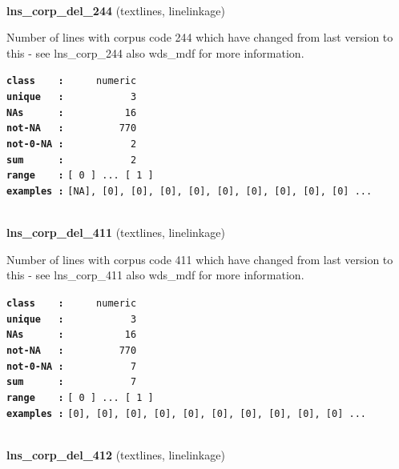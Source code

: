 \documentclass[]{article}
\begin{document}
~

\textbf{lns\_corp\_del\_244} (textlines, linelinkage)

Number of lines with corpus code 244 which have changed from last
version to this - see lns\_corp\_244 also wds\_mdf for more information.

\textbf{\texttt{class\ \ \ \ :}} \texttt{~~~~~numeric}\\
\textbf{\texttt{unique\ \ \ :}} \texttt{~~~~~~~~~~~3}\\
\textbf{\texttt{NAs\ \ \ \ \ \ :}} \texttt{~~~~~~~~~~16}\\
\textbf{\texttt{not-NA\ \ \ :}} \texttt{~~~~~~~~~770}\\
\textbf{\texttt{not-0-NA\ :}} \texttt{~~~~~~~~~~~2}\\
\textbf{\texttt{sum\ \ \ \ \ \ :}} \texttt{~~~~~~~~~~~2}\\
\textbf{\texttt{range\ \ \ \ :}}
\texttt{{[}\ 0\ {]}\ ...\ {[}\ 1\ {]}}\\
\textbf{\texttt{examples\ :}}
\texttt{{[}NA{]},\ {[}0{]},\ {[}0{]},\ {[}0{]},\ {[}0{]},\ {[}0{]},\ {[}0{]},\ {[}0{]},\ {[}0{]},\ {[}0{]}\ ...}\\

~

\textbf{lns\_corp\_del\_411} (textlines, linelinkage)

Number of lines with corpus code 411 which have changed from last
version to this - see lns\_corp\_411 also wds\_mdf for more information.

\textbf{\texttt{class\ \ \ \ :}} \texttt{~~~~~numeric}\\
\textbf{\texttt{unique\ \ \ :}} \texttt{~~~~~~~~~~~3}\\
\textbf{\texttt{NAs\ \ \ \ \ \ :}} \texttt{~~~~~~~~~~16}\\
\textbf{\texttt{not-NA\ \ \ :}} \texttt{~~~~~~~~~770}\\
\textbf{\texttt{not-0-NA\ :}} \texttt{~~~~~~~~~~~7}\\
\textbf{\texttt{sum\ \ \ \ \ \ :}} \texttt{~~~~~~~~~~~7}\\
\textbf{\texttt{range\ \ \ \ :}}
\texttt{{[}\ 0\ {]}\ ...\ {[}\ 1\ {]}}\\
\textbf{\texttt{examples\ :}}
\texttt{{[}0{]},\ {[}0{]},\ {[}0{]},\ {[}0{]},\ {[}0{]},\ {[}0{]},\ {[}0{]},\ {[}0{]},\ {[}0{]},\ {[}0{]}\ ...}\\

~

\textbf{lns\_corp\_del\_412} (textlines, linelinkage)
\end{document}
